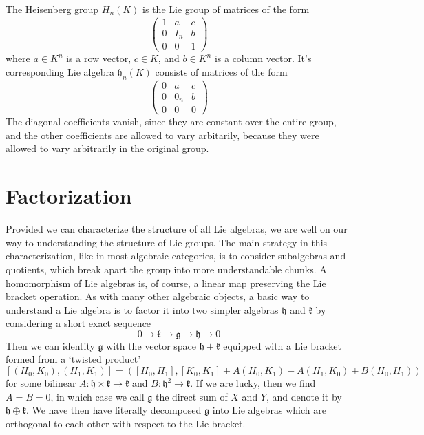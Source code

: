 \begin{example}
    The Heisenberg group $H_n(K)$ is the Lie group of matrices of the form
    \[ \begin{pmatrix} 1 & a & c \\ 0 & I_n & b \\ 0 & 0 & 1 \end{pmatrix} \]
    where $a \in K^n$ is a row vector, $c \in K$, and $b \in K^n$ is a column vector. It's corresponding Lie algebra $\mathfrak{h}_n(K)$ consists of matrices of the form
    \[ \begin{pmatrix} 0 & a & c \\ 0 & 0_n & b \\ 0 & 0 & 0 \end{pmatrix} \]
    The diagonal coefficients vanish, since they are constant over the entire group, and the other coefficients are allowed to vary arbitarily, because they were allowed to vary arbitrarily in the original group.
\end{example}

\section{Factorization}

Provided we can characterize the structure of all Lie algebras, we are well on our way to understanding the structure of Lie groups. The main strategy in this characterization, like in most algebraic categories, is to consider subalgebras and quotients, which break apart the group into more understandable chunks. A homomorphism of Lie algebras is, of course, a linear map preserving the Lie bracket operation. As with many other algebraic objects, a basic way to understand a Lie algebra is to factor it into two simpler algebras $\mathfrak{h}$ and $\mathfrak{k}$ by considering a short exact sequence
%
\[ 0 \to \mathfrak{k} \to \mathfrak{g} \to \mathfrak{h} \to 0 \]
%
Then we can identity $\mathfrak{g}$ with the vector space $\mathfrak{h} + \mathfrak{k}$ equipped with a Lie bracket formed from a `twisted product'
%
\[ [(H_0,K_0), (H_1,K_1)] = \left([H_0,H_1], [K_0,K_1] + A(H_0,K_1) - A(H_1,K_0) + B(H_0,H_1) \right) \]
%
for some bilinear $A: \mathfrak{h} \times \mathfrak{k} \to \mathfrak{k}$ and $B: \mathfrak{h}^2 \to \mathfrak{k}$. If we are lucky, then we find $A = B = 0$, in which case we call $\mathfrak{g}$ the direct sum of $X$ and $Y$, and denote it by $\mathfrak{h} \oplus \mathfrak{k}$. We have then have literally decomposed $\mathfrak{g}$ into Lie algebras which are orthogonal to each other with respect to the Lie bracket.

